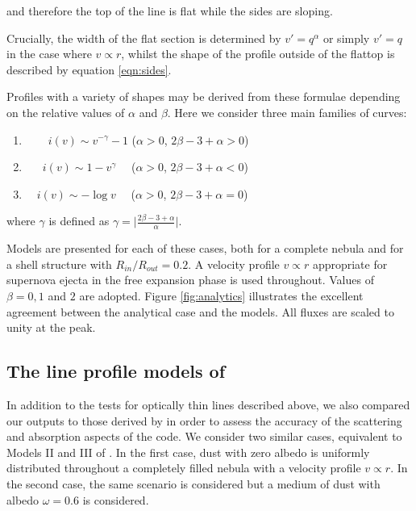 \noindent and therefore the top of the line is flat while the sides are 
sloping.

Crucially, the width of the flat section is determined by $v'=q^\alpha$ or 
simply $v'=q$ in the case where $v \propto r$, whilst the shape of the 
profile outside of the flattop is described by equation \ref{eqn:sides}.

Profiles with a variety of shapes may be derived from these formulae 
depending on the relative values of $\alpha$ and $\beta$.  Here we 
consider three main families of curves:


\begin{enumerate}\parskip3pt

	\item \ \ $\quad i(v)  \sim v^{-\gamma}-1$ \quad ($\alpha>0$, $2\beta-3+\alpha>0$)
	\item \ $\quad i(v)  \sim 1-v^\gamma$ \quad \ \ ($\alpha>0$, $2\beta-3+\alpha<0$)
	\item  $\quad i(v) \sim -\log v$ \quad \ \ ($\alpha>0$, $2\beta-3+\alpha=0$)

\end{enumerate}


\noindent where $\gamma$ is defined as $\gamma= \lvert 
\frac{2\beta-3+\alpha}{\alpha} \rvert$.

Models are presented for each of these cases, both for a 
complete nebula and for a shell structure with $R_{in}/R_{out}=0.2$.  
A velocity profile $v \propto r$ appropriate for supernova ejecta in the free 
expansion phase is used throughout.  Values of $\beta = 0, 1$ and $2$ are 
adopted.  Figure \ref{fig:analytics} illustrates the excellent agreement between 
the analytical case and the models.  All fluxes are scaled to unity at the peak.

\subsection{The line profile models of \citet{Lucy1989}}
\label{opt_thick_testing}

In addition to the tests for optically thin lines described above, we also 
compared our outputs to those derived by \citet{Lucy1989} in order to 
assess the accuracy of the scattering and absorption aspects of the code.  
We consider two similar cases, equivalent to Models II and III of 
\citet{Lucy1989}. In the first case, dust with zero albedo is 
uniformly distributed throughout a completely filled nebula with a velocity profile 
$v \propto r$.  In the second case, the same scenario is considered but a 
medium of dust with albedo $\omega =0.6$ is considered.

